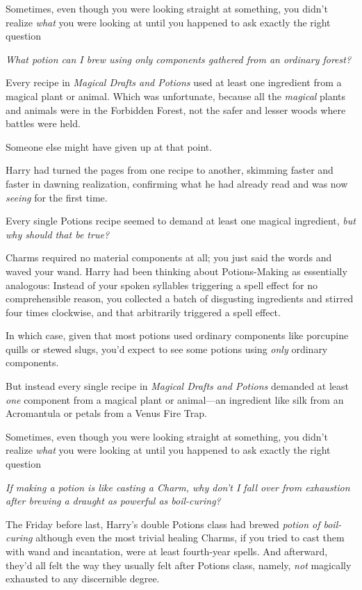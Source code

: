Sometimes, even though you were looking straight at something, you didn't
realize \emph{what} you were looking at until you happened to ask exactly the
right question{\el}

\emph{What potion can I brew using only components gathered from an ordinary
forest?}

Every recipe in \emph{Magical Drafts and Potions} used at least one ingredient
from a magical plant or animal. Which was unfortunate, because all the
\emph{magical} plants and animals were in the Forbidden Forest, not the safer
and lesser woods where battles were held.

Someone else might have given up at that point.

Harry had turned the pages from one recipe to another, skimming faster and
faster in dawning realization, confirming what he had already read and was now
\emph{seeing} for the first time.

Every single Potions recipe seemed to demand at least one magical ingredient,
\emph{but why should that be true?}

Charms required no material components at all; you just said the words and
waved your wand. Harry had been thinking about Potions-Making as essentially
analogous: Instead of your spoken syllables triggering a spell effect for no
comprehensible reason, you collected a batch of disgusting ingredients and
stirred four times clockwise, and that arbitrarily triggered a spell effect.

In which case, given that most potions used ordinary components like porcupine
quills or stewed slugs, you'd expect to see some potions using \emph{only}
ordinary components.

But instead every single recipe in \emph{Magical Drafts and Potions} demanded
at least \emph{one} component from a magical plant or animal—an ingredient
like silk from an Acromantula or petals from a Venus Fire Trap.

Sometimes, even though you were looking straight at something, you didn't
realize \emph{what} you were looking at until you happened to ask exactly the
right question{\el}

\emph{If making a potion is like casting a Charm, why don't I fall over from
exhaustion after brewing a draught as powerful as boil-curing?}

The Friday before last, Harry's double Potions class had brewed \emph{potion of
boil-curing{\el}} although even the most trivial healing Charms, if you
tried to cast them with wand and incantation, were at least fourth-year spells.
And afterward, they'd all felt the way they usually felt after Potions class,
namely, \emph{not} magically exhausted to any discernible degree.

